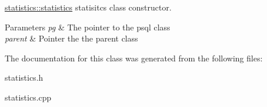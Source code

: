 \hyperlink{classstatistics_aaa102e49836a3b719df3a82e28735adc}{statistics\+::statistics} statisitcs class constructor. 


\begin{DoxyParams}{Parameters}
{\em pg} & The pointer to the psql class \\
\hline
{\em parent} & Pointer the the parent class \\
\hline
\end{DoxyParams}


The documentation for this class was generated from the following files\+:\begin{DoxyCompactItemize}
\item 
statistics.\+h\item 
statistics.\+cpp\end{DoxyCompactItemize}
